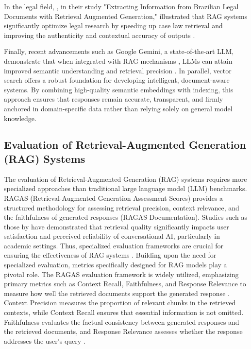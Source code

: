 \begin{refsection}
In the legal field, \citeauthor{aquino2024extracting} \citeyear{aquino2024extracting}, in their study "Extracting Information from Brazilian Legal Documents with Retrieval Augmented Generation," illustrated that RAG systems significantly optimize legal research by speeding up case law retrieval and improving the authenticity and contextual accuracy of outputs \cite{aquino2024extracting}. 


Finally, recent advancements such as Google Gemini, a state-of-the-art LLM, demonstrate that when integrated with RAG mechanisms \citeauthor{prabhulal2025ragpipeline} \citeyear{prabhulal2025ragpipeline}, LLMs can attain improved semantic understanding and retrieval precision \cite{prabhulal2025ragpipeline}. In parallel, vector search offers a robust foundation for developing intelligent, document-aware systems. By combining high-quality semantic embeddings with indexing, this approach ensures that responses remain accurate, transparent, and firmly anchored in domain-specific data rather than relying solely on general model knowledge.


\subsection{Evaluation of Retrieval-Augmented Generation (RAG) Systems}

The evaluation of Retrieval-Augmented Generation (RAG) systems requires more specialized approaches than traditional large language model (LLM) benchmarks. RAGAS (Retrieval-Augmented Generation Assessment Scores) provides a structured methodology for assessing retrieval precision, context relevance, and the faithfulness of generated responses (RAGAS Documentation). Studies such as those by \citeauthor{shuster2021retrieval} \citeyear{shuster2021retrieval} have demonstrated that retrieval quality significantly impacts user satisfaction and perceived reliability of conversational AI, particularly in academic settings. Thus, specialized evaluation frameworks are crucial for ensuring the effectiveness of RAG systems \cite{shuster2021retrieval}.
Building upon the need for specialized evaluation, metrics specifically designed for RAG models play a pivotal role. The RAGAS evaluation framework is widely utilized, emphasizing primary metrics such as Context Recall, Faithfulness, and Response Relevance to measure how well the retrieved documents support the generated response \cite{roychowdhury2024evaluation}.
Context Precision measures the proportion of relevant chunks in the retrieved contexts, while Context Recall ensures that essential information is not omitted. Faithfulness evaluates the factual consistency between generated responses and the retrieved documents, and Response Relevance assesses whether the response addresses the user's query \cite{aquino2024extracting} \cite{deepak2025langchain}.


\end{refsection}
